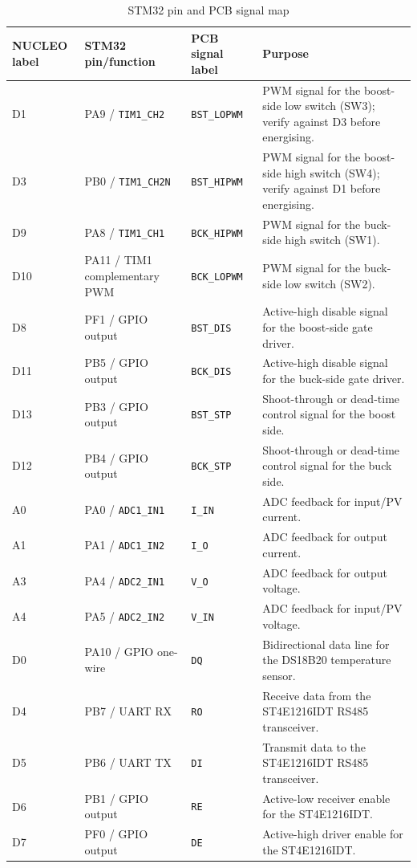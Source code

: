 \documentclass[11pt,a4paper]{article}
\newcommand{\code}[1]{\texttt{#1}}
\begin{document}
\begin{table}[H]
  \centering
  \footnotesize
  \caption{STM32 pin and PCB signal map}
  \label{tab:firmware-interface}
  \begin{tabularx}{\textwidth}{@{}L{0.12\textwidth} L{0.21\textwidth} L{0.20\textwidth} Y@{}}
    \toprule
    \textbf{NUCLEO label} & \textbf{STM32 pin/function} & \textbf{PCB signal label} & \textbf{Purpose} \\
    \midrule
    D1  & PA9 / \code{TIM1\_CH2} & \code{BST\_LOPWM} & PWM signal for the boost-side low switch (SW3); verify against D3 before energising. \\
    D3  & PB0 / \code{TIM1\_CH2N} & \code{BST\_HIPWM} & PWM signal for the boost-side high switch (SW4); verify against D1 before energising. \\
    D9  & PA8 / \code{TIM1\_CH1} & \code{BCK\_HIPWM} & PWM signal for the buck-side high switch (SW1). \\
    D10 & PA11 / TIM1 complementary PWM & \code{BCK\_LOPWM} & PWM signal for the buck-side low switch (SW2). \\
    D8  & PF1 / GPIO output & \code{BST\_DIS} & Active-high disable signal for the boost-side gate driver. \\
    D11 & PB5 / GPIO output & \code{BCK\_DIS} & Active-high disable signal for the buck-side gate driver. \\
    D13 & PB3 / GPIO output & \code{BST\_STP} & Shoot-through or dead-time control signal for the boost side. \\
    D12 & PB4 / GPIO output & \code{BCK\_STP} & Shoot-through or dead-time control signal for the buck side. \\
    A0  & PA0 / \code{ADC1\_IN1} & \code{I\_IN} & ADC feedback for input/PV current. \\
    A1  & PA1 / \code{ADC1\_IN2} & \code{I\_O} & ADC feedback for output current. \\
    A3  & PA4 / \code{ADC2\_IN1} & \code{V\_O} & ADC feedback for output voltage. \\
    A4  & PA5 / \code{ADC2\_IN2} & \code{V\_IN} & ADC feedback for input/PV voltage. \\
    D0  & PA10 / GPIO one-wire & \code{DQ} & Bidirectional data line for the DS18B20 temperature sensor. \\
    D4  & PB7 / UART RX & \code{RO} & Receive data from the ST4E1216IDT RS485 transceiver. \\
    D5  & PB6 / UART TX & \code{DI} & Transmit data to the ST4E1216IDT RS485 transceiver. \\
    D6  & PB1 / GPIO output & \code{RE} & Active-low receiver enable for the ST4E1216IDT. \\
    D7  & PF0 / GPIO output & \code{DE} & Active-high driver enable for the ST4E1216IDT. \\
    \bottomrule
  \end{tabularx}
\end{table}
\end{document}
